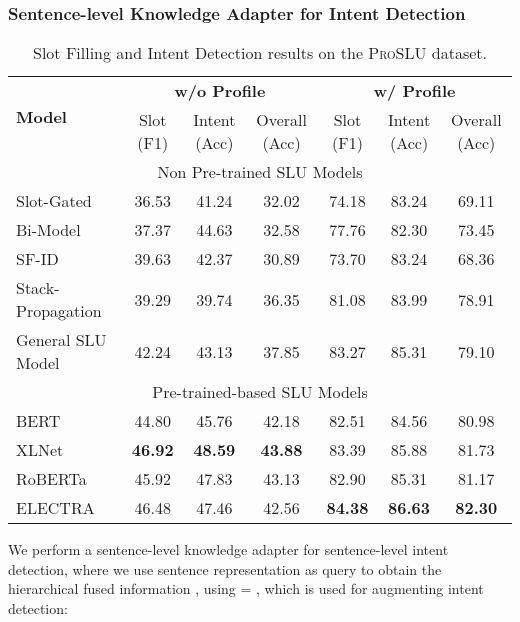 \documentclass[letterpaper]{article} \usepackage{aaai22}  \usepackage{times}  \usepackage{helvet}  \usepackage{courier}  \usepackage[hyphens]{url}  \usepackage{graphicx} \urlstyle{rm} \def\UrlFont{\rm}  \usepackage{natbib}  \usepackage{caption} \DeclareCaptionStyle{ruled}{labelfont=normalfont,labelsep=colon,strut=off} \frenchspacing  \setlength{\pdfpagewidth}{8.5in}  \setlength{\pdfpageheight}{11in}  \usepackage{algorithm}
\begin{document}
\subsubsection{Sentence-level Knowledge Adapter for Intent Detection}
\begin{table*}[ht]
	\centering
	\begin{adjustbox}{width=0.95\textwidth}
		\begin{tabular}{l|c|c|c|c|c|c}
			\hline \hline
			\multirow{2}{*}{\textbf{Model}} & \multicolumn{3}{c|}{\textbf{w/o Profile}}& \multicolumn{3}{c}{\textbf{w/ Profile}}\\ \cline{2-7}
			& {Slot (F1)}  & {Intent (Acc)}   & {Overall (Acc)} & {Slot (F1)}  & {Intent (Acc)}   & {Overall (Acc)} \\ 
			\hline 
			\multicolumn{7}{c}{Non Pre-trained SLU Models} \\
			\hline
			Slot-Gated~\citep{goo-etal-2018-slot} & 36.53 & 41.24 & 32.02 & 74.18 & 83.24 & 69.11 \\
			Bi-Model~\citep{wang-etal-2018-bi}& 37.37 & 44.63 & 32.58 & 77.76 & 82.30 & 73.45 \\
			SF-ID~\citep{e-etal-2019-novel} & 39.63 & 42.37 & 30.89 & 73.70 & 83.24 & 68.36 \\
			Stack-Propagation~\citep{qin-etal-2019-stack} & 39.29 & 39.74 & 36.35 & 81.08 & 83.99 & 78.91 \\
			General SLU Model & 42.24 & 43.13 & 37.85 & 83.27 & 85.31 & 79.10 \\
			\hline 
            \multicolumn{7}{c}{Pre-trained-based SLU Models} \\
            \hline
			BERT~\citep{devlin-etal-2019-bert} & 44.80 & 45.76 & 42.18 & 82.51 & 84.56 & 80.98 \\
			XLNet~\citep{yang2019xlnet} & \textbf{46.92} & \textbf{48.59} & \textbf{43.88} & 83.39 & 85.88 & 81.73 \\
			RoBERTa~\citep{liu2019roberta} & 45.92 & 47.83 & 43.13 & 82.90 & 85.31 & 81.17 \\
			ELECTRA~\citep{clark2020electra} & 46.48 & 47.46 & 42.56 & \textbf{84.38} & \textbf{86.63} & \textbf{82.30} \\
            \hline \hline
		\end{tabular}
	\end{adjustbox}
	\caption{
		Slot Filling and Intent Detection results on the \textsc{ProSLU} dataset.
	}
	\label{tab:results}
\end{table*}

We perform a sentence-level knowledge adapter for sentence-level intent detection, where we use sentence representation  as query to obtain the hierarchical fused information , using  = , which is used for augmenting intent detection:
\end{document}
